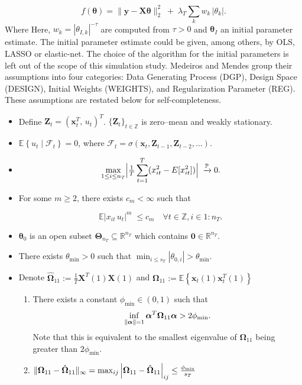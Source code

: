 \documentclass[10pt,a4paper,oneside]{article}
\newcommand{\Z}{\mathbb{Z}}
\newcommand{\R}{\mathbb{R}}
\newcommand{\Prob}{\mathbb{P}}
\newcommand{\E}{\mathbb{E}}
\newcommand{\SigAl}{\mathcal{F}}
\DeclarePairedDelimiter{\norma}{\lVert}{\rVert} %
\providecommand{\DIFaddtex}[1]{{\protect\color{blue} \sf #1}} %
\providecommand{\DIFdeltex}[1]{{\protect\color{red} \scriptsize #1}} %
\providecommand{\DIFaddbegin}{} %
\providecommand{\DIFaddend}{} %
\providecommand{\DIFdelbegin}{} %
\providecommand{\DIFdelend}{} %
\providecommand{\DIFadd}[1]{\texorpdfstring{\DIFaddtex{#1}}{#1}} %
\providecommand{\DIFdel}[1]{\texorpdfstring{\DIFdeltex{#1}}{}} %
\newcommand{\DIFscaledelfig}{0.5}
\newlength{\DIFdelgraphicswidth} %
\newlength{\DIFdelgraphicsheight} %
\newcommand{\DIFaddincludegraphics}[2][]{{\color{blue}\fbox{\DIFOincludegraphics[#1]{#2}}}} %
\newcommand{\DIFdelincludegraphics}[2][]{%
\sbox{\DIFdelgraphicsbox}{\DIFOincludegraphics[#1]{#2}}%
\settoboxwidth{\DIFdelgraphicswidth}{\DIFdelgraphicsbox} %
\settoboxtotalheight{\DIFdelgraphicsheight}{\DIFdelgraphicsbox} %
\scalebox{\DIFscaledelfig}{%
\parbox[b]{\DIFdelgraphicswidth}{\usebox{\DIFdelgraphicsbox}\\[-\baselineskip] \rule{\DIFdelgraphicswidth}{0em}}\llap{\resizebox{\DIFdelgraphicswidth}{\DIFdelgraphicsheight}{%
\setlength{\unitlength}{\DIFdelgraphicswidth}%
\begin{picture}(1,1)%
\thicklines\linethickness{2pt} %
{\color[rgb]{1,0,0}\put(0,0){\framebox(1,1){}}}%
{\color[rgb]{1,0,0}\put(0,0){\line( 1,1){1}}}%
{\color[rgb]{1,0,0}\put(0,1){\line(1,-1){1}}}%
\end{picture}%
}\hspace*{3pt}}} %
} %
\DeclareRobustCommand{\DIFaddbegin}{\DIFOaddbegin \let\includegraphics\DIFaddincludegraphics} %
\DeclareRobustCommand{\DIFaddend}{\DIFOaddend \let\includegraphics\DIFOincludegraphics} %
\DeclareRobustCommand{\DIFdelbegin}{\DIFOdelbegin \let\includegraphics\DIFdelincludegraphics} %
\DeclareRobustCommand{\DIFdelend}{\DIFOaddend \let\includegraphics\DIFOincludegraphics} %
\begin{document}
\[
        f(\boldsymbol{\theta}) = \bigl\|\mathbf{y} -  \mathbf{X}\boldsymbol{\theta}\bigr\|_2^2
        \;+\;\lambda_T\sum_{k} w_k\,|\theta_k|.
\]
\DIFdelbegin \DIFdel{Where }\DIFdelend \DIFaddbegin \DIFadd{Here, }\DIFaddend $w_k = \left| \theta_{I, k} \right|^{-\tau}$ are computed from $\tau > 0$ and $\boldsymbol{\theta}_I$ an initial parameter estimate. The initial parameter estimate could be given, among others, by OLS, LASSO or elastic-net. The choice of the algorithm for the initial parameters is left out of the scope of this simulation study. Medeiros and Mendes group their assumptions into four categories: Data Generating Process (DGP), Design Space (DESIGN), Initial Weights (WEIGHTS), and Regularization Parameter (REG). These assumptions are restated below for self-completeness.


\begin{itemize}
  \item[(DGP1)] Define $\mathbf{Z}_t = (\mathbf{x}_t^T,\,u_t)^T$. $\{\mathbf{Z}_t\}_{t \in \Z}$ is zero–mean and weakly stationary.
  \item[(DGP2)] $\E \left\{ u_t\mid \SigAl_t\right\}=0$, where $\SigAl_t=\sigma(\mathbf{x}_t, \mathbf{Z}_{t-1}, \mathbf{Z}_{t-2},\dots)$.
  \item[(DGP3)] 
  \[
     \max_{1\le i\le n_T}\Bigl|\tfrac1T\sum_{t=1}^T(x_{it}^2 - E[x_{it}^2])\Bigr|\;\xrightarrow[]{\Prob}0.
  \]
  \item[(DGP4)] For some $m \geq 2$, there exists $c_m < \infty$ such that

  \[
     \E\bigl|x_{it}\,u_t\bigr|^m\;\le c_m \quad \forall t\in \Z, i \in1:n_T.
  \]

  \item[(DESIGN1)] $\mathbf{\theta}_0$ is an open subset $\boldsymbol{\Theta}_{n_T} \subseteq \R^{n_T}$ which contains $\mathbf{0} \in \R^{n_T}$.
  \item[(DESIGN2)] There exists $\theta_{\min} > 0$ such that $\min_{i\le s_T}|\theta_{0,i}|>\theta_{\min}$.
  \item[(DESIGN3)] Denote $\hat{\boldsymbol{\Omega}}_{11} := \frac{1}{T}\mathbf{X}^T(1) \mathbf{X}(1)$ and $\boldsymbol{\Omega}_{11} := \E \left\{ \mathbf{x}_t(1) \mathbf{x}^T_t(1) \right\}$
    \begin{enumerate}
      \item[(a)] There exists a constant $\phi_{\min} \in (0, 1)$ such that
      $$
      \inf_{\norma{\boldsymbol{\alpha}} = 1} \boldsymbol{\alpha}^T \boldsymbol{\Omega}_{11} \boldsymbol{\alpha} > 2 \phi_{\min}.
      $$
      Note that this is equivalent to the smallest eigenvalue of $\boldsymbol{\Omega}_{11}$ being greater than $2\phi_{\min}$.
      \item[(b)] $\norma{\boldsymbol{\Omega}_{11} - \hat{\boldsymbol{\Omega}}_{11}}_{\infty} = \max_{ij} \left| \boldsymbol{\Omega}_{11} - \hat{\boldsymbol{\Omega}}_{11}\right|_{ij} \leq \frac{\phi_{\min}}{s_T}$


\end{enumerate}
\end{itemize}
\end{document}
